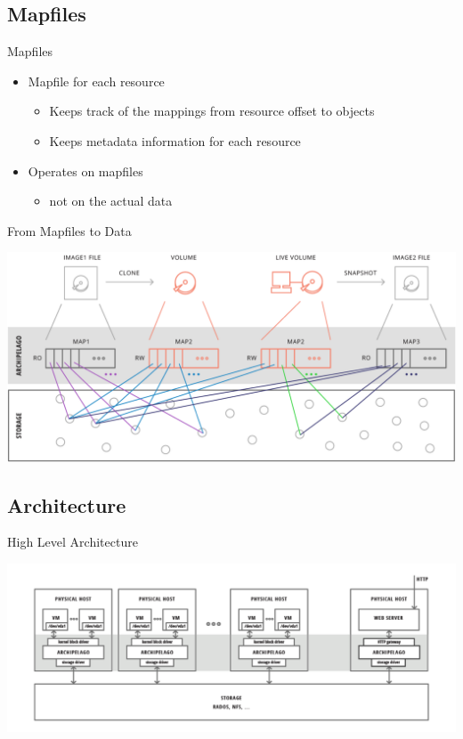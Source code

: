 \documentclass[utf8]{beamer}
\begin{document}
\subsection{Mapfiles}

\begin{frame}{Mapfiles}
  \begin{itemize}
  \item Mapfile for each resource
    \begin{itemize}
      \item Keeps track of the mappings from resource offset to objects
      \item Keeps metadata information for each resource
    \end{itemize}
  \item Operates on mapfiles
    \begin{itemize}
      \item not on the actual data
    \end{itemize}
  \end{itemize}
\end{frame}

\begin{frame}{From Mapfiles to Data}
  \begin{center}
    \includegraphics[width=.90\linewidth]{figures/mapfiles.png}
  \end{center}
\end{frame}

\subsection{Architecture}

\begin{frame}{High Level Architecture}
  \begin{center}
    \includegraphics[width=.90\linewidth]{figures/high-architecture.png}
  \end{center}
\end{frame}
\end{document}
